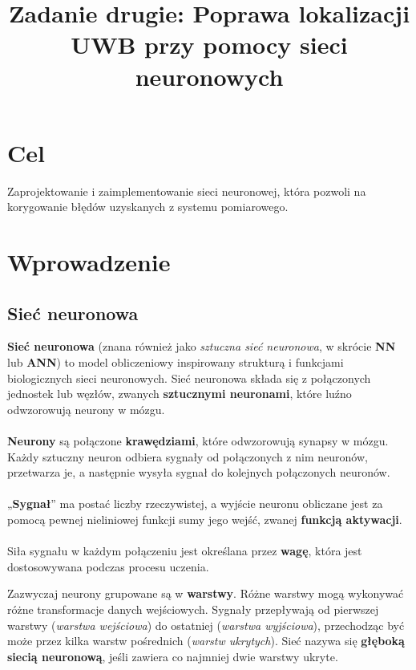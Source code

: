 \documentclass{classrep}
\author{
  \studentinfo{Mikołaj Pawłoś}{258681} \and
  \studentinfo{Emilia Szczerba}{251643}
}
\title{Zadanie drugie: Poprawa lokalizacji UWB przy pomocy sieci neuronowych}
\begin{document}
\maketitle

\section{Cel}
 {Zaprojektowanie i zaimplementowanie sieci neuronowej,
  która pozwoli na korygowanie błędów uzyskanych z systemu pomiarowego.}


\section{Wprowadzenie}
\paragraph{}

\subsection{Sieć neuronowa}
\textbf{Sieć neuronowa} (znana również jako \textit{sztuczna sieć neuronowa},
w skrócie \textbf{NN} lub \textbf{ANN})
to model obliczeniowy inspirowany strukturą i funkcjami biologicznych sieci neuronowych.
Sieć neuronowa składa się z połączonych jednostek lub węzłów, zwanych \textbf{sztucznymi neuronami}, które luźno odwzorowują neurony w mózgu.
\paragraph{}
\textbf{Neurony} są połączone \textbf{krawędziami}, które odwzorowują synapsy w mózgu. Każdy sztuczny neuron odbiera sygnały od połączonych z nim neuronów, przetwarza je, a następnie wysyła sygnał do kolejnych połączonych neuronów.
\paragraph{}
„\textbf{Sygnał}” ma postać liczby rzeczywistej, a wyjście neuronu obliczane jest
za pomocą pewnej nieliniowej funkcji sumy jego wejść, zwanej \textbf{funkcją aktywacji}.
\paragraph{}
Siła sygnału w każdym połączeniu jest określana przez \textbf{wagę}, która jest dostosowywana podczas procesu uczenia.

Zazwyczaj neurony grupowane są w \textbf{warstwy}. Różne warstwy mogą wykonywać różne transformacje danych wejściowych.
Sygnały przepływają od pierwszej warstwy (\textit{warstwa wejściowa}) do ostatniej (\textit{warstwa wyjściowa}),
przechodząc być może przez kilka warstw pośrednich (\textit{warstw ukrytych}).
Sieć nazywa się \textbf{głęboką siecią neuronową}, jeśli zawiera co najmniej dwie warstwy ukryte.
\end{document}
